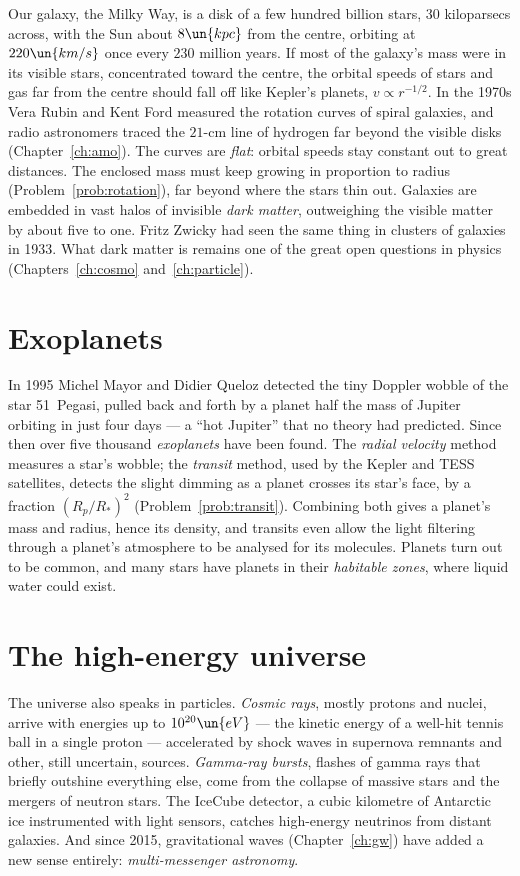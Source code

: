 Our galaxy, the Milky Way, is a disk of a few hundred billion stars, $30$ kiloparsecs across, with the Sun about $8\un{kpc}$ from the centre, orbiting at $220\un{km/s}$ once every $230$ million years. If most of the galaxy's mass were in its visible stars, concentrated toward the centre, the orbital speeds of stars and gas far from the centre should fall off like Kepler's planets, $v\propto r^{-1/2}$. In the 1970s Vera Rubin and Kent Ford measured the rotation curves of spiral galaxies, and radio astronomers traced the $21$-cm line of hydrogen far beyond the visible disks (Chapter~\ref{ch:amo}). The curves are \emph{flat}: orbital speeds stay constant out to great distances. The enclosed mass must keep growing in proportion to radius (Problem~\ref{prob:rotation}), far beyond where the stars thin out. Galaxies are embedded in vast halos of invisible \emph{dark matter}, outweighing the visible matter by about five to one. Fritz Zwicky had seen the same thing in clusters of galaxies in 1933. What dark matter is remains one of the great open questions in physics (Chapters~\ref{ch:cosmo} and~\ref{ch:particle}).

\section{Exoplanets}

In 1995 Michel Mayor and Didier Queloz detected the tiny Doppler wobble of the star 51~Pegasi, pulled back and forth by a planet half the mass of Jupiter orbiting in just four days --- a ``hot Jupiter'' that no theory had predicted. Since then over five thousand \emph{exoplanets} have been found. The \emph{radial velocity} method measures a star's wobble; the \emph{transit} method, used by the Kepler and TESS satellites, detects the slight dimming as a planet crosses its star's face, by a fraction $(R_p/R_*)^2$ (Problem~\ref{prob:transit}). Combining both gives a planet's mass and radius, hence its density, and transits even allow the light filtering through a planet's atmosphere to be analysed for its molecules. Planets turn out to be common, and many stars have planets in their \emph{habitable zones}, where liquid water could exist.

\section{The high-energy universe}

The universe also speaks in particles. \emph{Cosmic rays}, mostly protons and nuclei, arrive with energies up to $10^{20}\un{eV}$ --- the kinetic energy of a well-hit tennis ball in a single proton --- accelerated by shock waves in supernova remnants and other, still uncertain, sources. \emph{Gamma-ray bursts}, flashes of gamma rays that briefly outshine everything else, come from the collapse of massive stars and the mergers of neutron stars. The IceCube detector, a cubic kilometre of Antarctic ice instrumented with light sensors, catches high-energy neutrinos from distant galaxies. And since 2015, gravitational waves (Chapter~\ref{ch:gw}) have added a new sense entirely: \emph{multi-messenger astronomy}.

